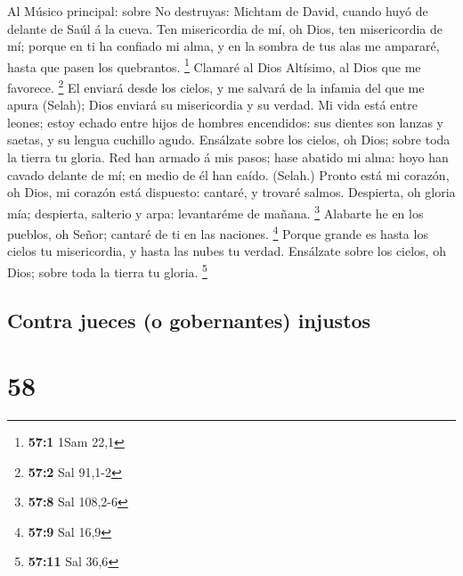  Al Músico principal: sobre No destruyas: Michtam de David,
cuando huyó de delante de Saúl á la cueva. Ten misericordia de mí, oh
Dios, ten misericordia de mí; porque en ti ha confiado mi alma, y en la
sombra de tus alas me ampararé, hasta que pasen los quebrantos.
\footnote{\textbf{57:1} 1Sam 22,1}  Clamaré al Dios
Altísimo, al Dios que me favorece. \footnote{\textbf{57:2} Sal 91,1-2}
 El enviará desde los cielos, y me salvará de la infamia del
que me apura (Selah); Dios enviará su misericordia y su verdad.
 Mi vida está entre leones; estoy echado entre hijos de
hombres encendidos: sus dientes son lanzas y saetas, y su lengua
cuchillo agudo.  Ensálzate sobre los cielos, oh Dios; sobre
toda la tierra tu gloria.  Red han armado á mis pasos; hase
abatido mi alma: hoyo han cavado delante de mí; en medio de él han
caído. (Selah.)  Pronto está mi corazón, oh Dios, mi corazón
está dispuesto: cantaré, y trovaré salmos.  Despierta, oh
gloria mía; despierta, salterio y arpa: levantaréme de mañana.
\footnote{\textbf{57:8} Sal 108,2-6}  Alabarte he en los
pueblos, oh Señor; cantaré de ti en las naciones. \footnote{\textbf{57:9}
  Sal 16,9}  Porque grande es hasta los cielos tu
misericordia, y hasta las nubes tu verdad.  Ensálzate sobre
los cielos, oh Dios; sobre toda la tierra tu gloria. \footnote{\textbf{57:11}
  Sal 36,6}

\hypertarget{contra-jueces-o-gobernantes-injustos}{%
\subsection{Contra jueces (o gobernantes)
injustos}\label{contra-jueces-o-gobernantes-injustos}}

\hypertarget{section-57}{%
\section{58}\label{section-57}}

